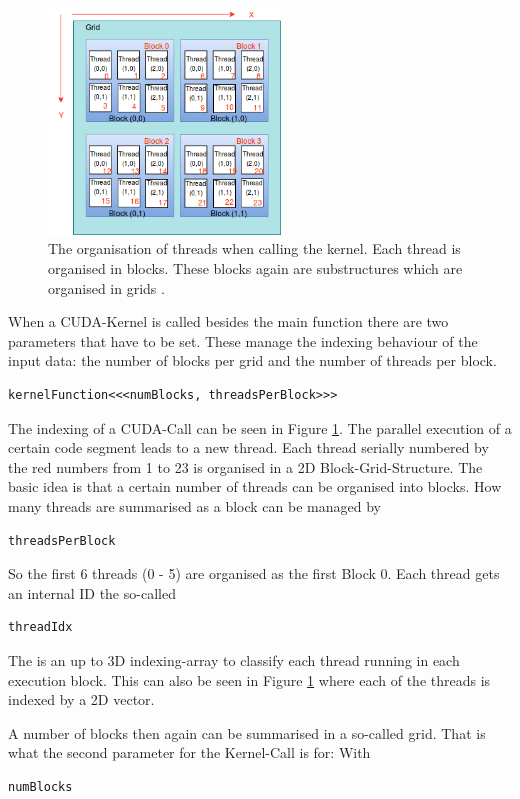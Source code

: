 \begin{figure}[H]
    \centering
    \includegraphics[width=0.55\textwidth]{Graphics/CudaIndexing.png}
    \caption{The organisation of threads when calling the kernel. Each thread is organised in blocks. These blocks again are substructures which are organised in grids \cite{cuda_indexing_guide}.}
    \label{cuda_index}
\end{figure}

When a CUDA-Kernel is called besides the main function there are two parameters that have to be set. These manage the indexing behaviour of the input data: the number of blocks per grid and the number of threads per block.
\begin{verbatim}
kernelFunction<<<numBlocks, threadsPerBlock>>>
\end{verbatim}
The indexing of a CUDA-Call can be seen in Figure \ref{cuda_index}. 
The parallel execution of a certain code segment leads to a new thread. Each thread serially numbered by the red numbers from 1 to 23 is organised in a 2D Block-Grid-Structure. The basic idea is that a certain number of threads can be organised into blocks. How many threads are summarised as a block can be managed by \begin{verbatim}
threadsPerBlock
\end{verbatim}
So the first 6 threads (0 - 5) are organised as the first Block 0. Each thread gets an internal ID the so-called  \begin{verbatim}
threadIdx
\end{verbatim}

The  is an up to 3D indexing-array to classify each thread running in each execution block. This can also be seen in Figure \ref{cuda_index} where each of the threads is indexed by a 2D vector.

A number of blocks then again can be summarised in a so-called grid. That is what the second parameter for the Kernel-Call is for:
With \begin{verbatim}
numBlocks
\end{verbatim}

